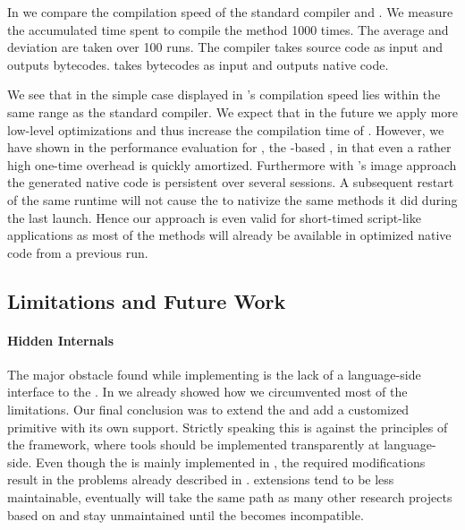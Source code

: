 \noindent In  we compare the compilation speed of the standard \PH compiler and \NBJ.
We measure the accumulated time spent to compile the method 1000 times.
The average and deviation are taken over 100 runs. 
The \PH compiler takes source code as input and outputs \ST bytecodes.
\NBJ takes bytecodes as input and outputs native code.

We see that in the simple case displayed in  \NBJ's compilation speed lies within the same range as the standard \ST compiler.
We expect that in the future we apply more low-level optimizations and thus increase the compilation time of \NBJ.
However, we have shown in the performance evaluation for \NB, the \B-based \FFI, in  that even a rather high one-time overhead is quickly amortized.
Furthermore with \ST's image approach the generated native code is persistent over several sessions.
A subsequent restart of the same runtime will not cause the \JIT to nativize the same methods it did during the last launch.
Hence our approach is even valid for short-timed script-like applications as most of the methods will already be available in optimized native code from a previous run.


\subsection{\NBJ Limitations and Future Work}
\paragraph{Hidden \VM Internals}
The major obstacle found while implementing \NBJ is the lack of a language-side interface to the \JIT.
In  we already showed how we circumvented most of the limitations.
Our final conclusion was to extend the \VM and add a customized primitive with its own \JIT support.
Strictly speaking this is against the principles of the \B framework, where tools should be implemented transparently at language-side.
Even though the \NBJ is mainly implemented in \PH, the required \VM modifications result in the problems already described in .
\VM extensions tend to be less maintainable, eventually \NBJ will take the same path as many other research \VM projects based on \PH and stay unmaintained until the \VM becomes incompatible.

